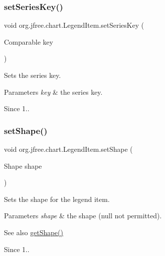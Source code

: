 \subsubsection{\texorpdfstring{set\+Series\+Key()}{setSeriesKey()}}
{\footnotesize\ttfamily void org.\+jfree.\+chart.\+Legend\+Item.\+set\+Series\+Key (\begin{DoxyParamCaption}\item[{Comparable}]{key }\end{DoxyParamCaption})}

Sets the series key.


\begin{DoxyParams}{Parameters}
{\em key} & the series key.\\
\hline
\end{DoxyParams}
\begin{DoxySince}{Since}
1.. 
\end{DoxySince}
\mbox{\label{classorg_1_1jfree_1_1chart_1_1_legend_item_a14e41e94aa2b13b01b1cf3c6ff12dc55}} 
\subsubsection{\texorpdfstring{set\+Shape()}{setShape()}}
{\footnotesize\ttfamily void org.\+jfree.\+chart.\+Legend\+Item.\+set\+Shape (\begin{DoxyParamCaption}\item[{Shape}]{shape }\end{DoxyParamCaption})}

Sets the shape for the legend item.


\begin{DoxyParams}{Parameters}
{\em shape} & the shape ({\ttfamily null} not permitted).\\
\hline
\end{DoxyParams}
\begin{DoxySeeAlso}{See also}
\mbox{\hyperlink{classorg_1_1jfree_1_1chart_1_1_legend_item_a08b6718ae34a4c7be04cdf48494cc1d3}{get\+Shape()}} 
\end{DoxySeeAlso}
\begin{DoxySince}{Since}
1.. 
\end{DoxySince}
\mbox{\label{classorg_1_1jfree_1_1chart_1_1_legend_item_a87c9eb5f4151a2f1c3e753db786d7690}} 
